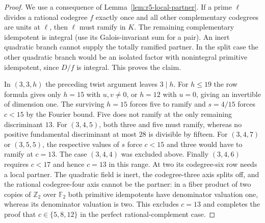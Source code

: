 \documentclass[11pt,a4paper]{article}
\numberwithin{equation}{section}
\begin{document}
\begin{proof}
We use a consequence of Lemma~\ref{lem:r5-local-partner}.
If a prime $\ell$ divides a rational codegree $f$ exactly once
and all other complementary codegrees are units at $\ell$, then
$\ell$ must ramify in $K$. The remaining complementary idempotent
is integral (use its Galois-invariant sum for a pair). An inert
quadratic branch cannot supply the totally ramified partner. In
the split case the other quadratic branch would be an isolated factor
with nonintegral primitive idempotent, since $D/f$ is integral.
This proves the claim.

In $(3,3,h)$ the preceding twist argument leaves $3\mid h$.
For $h\le19$ the row formula gives only $h=15$ with $u,v\ne0$,
or $h=12$ with $u=0$, giving an invertible of dimension one.
The surviving $h=15$ forces five to ramify and
$s=4/15$ forces $c<15$ by the Fourier bound. Five does not ramify
at the only remaining discriminant $13$.
For $(3,4,5)$, both three and five must ramify, whereas no positive
fundamental discriminant at most $28$ is divisible by fifteen.
For $(3,4,7)$ or $(3,5,5)$, the respective values of $s$ force
$c<15$ and three would have to ramify at $c=13$. The case
$(3,4,4)$ was excluded above.
Finally $(3,4,6)$ requires $c<17$ and hence $c=13$ in this range.
At two its codegree-six row needs a local partner. The quadratic
field is inert, the codegree-three axis splits off, and the rational
codegree-four axis cannot be the partner: in a fiber product of two
copies of $\mathbb Z_2$ over $\mathbb F_2$ both primitive idempotents
have denominator valuation one, whereas its denominator valuation is
two. This excludes $c=13$ and completes the proof that
$c\in\{5,8,12\}$ in the perfect rational-complement case.


\end{proof}
\end{document}

